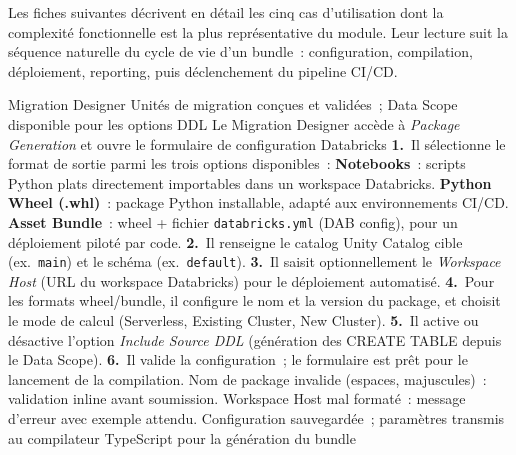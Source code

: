 Les fiches suivantes décrivent en détail les cinq cas d'utilisation dont la complexité fonctionnelle est la plus représentative du module. Leur lecture suit la séquence naturelle du cycle de vie d'un bundle~: configuration, compilation, déploiement, reporting, puis déclenchement du pipeline CI/CD.

\medskip

  {Migration Designer}
  {Unités de migration conçues et validées~; Data Scope disponible pour les options DDL}
  {Le Migration Designer accède à \textit{Package Generation} et ouvre le formulaire de configuration Databricks}
  {\textbf{1.}~Il sélectionne le format de sortie parmi les trois options disponibles~:\newline
   \quad\textbf{Notebooks}~: scripts Python plats directement importables dans un workspace Databricks.\newline
   \quad\textbf{Python Wheel (.whl)}~: package Python installable, adapté aux environnements CI/CD.\newline
   \quad\textbf{Asset Bundle}~: wheel + fichier \texttt{databricks.yml} (DAB config), pour un déploiement piloté par code.\newline
   \textbf{2.}~Il renseigne le catalog Unity Catalog cible (ex.~\texttt{main}) et le schéma (ex.~\texttt{default}).\newline
   \textbf{3.}~Il saisit optionnellement le \textit{Workspace Host} (URL du workspace Databricks) pour le déploiement automatisé.\newline
   \textbf{4.}~Pour les formats wheel/bundle, il configure le nom et la version du package, et choisit le mode de calcul (Serverless, Existing Cluster, New Cluster).\newline
   \textbf{5.}~Il active ou désactive l'option \textit{Include Source DDL} (génération des CREATE TABLE depuis le Data Scope).\newline
   \textbf{6.}~Il valide la configuration~; le formulaire est prêt pour le lancement de la compilation.}
  {Nom de package invalide (espaces, majuscules)~: validation inline avant soumission. Workspace Host mal formaté~: message d'erreur avec exemple attendu.}
  {Configuration sauvegardée~; paramètres transmis au compilateur TypeScript pour la génération du bundle}

\medskip

